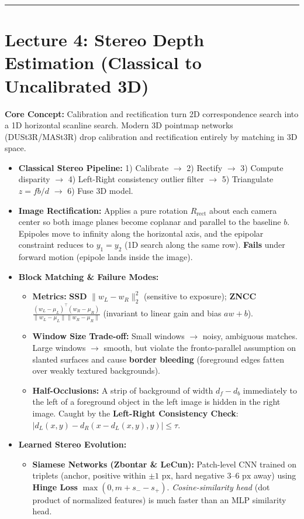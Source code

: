 \documentclass[10pt, a4paper]{article}
\newcommand{\hr}{\vspace{0.8em}\hrule\vspace{0.8em}}
\begin{document}
\hr
\section*{\textcolor{primary}{Lecture 4: Stereo Depth Estimation (Classical to Uncalibrated 3D)}}
\textbf{Core Concept:} Calibration and rectification turn 2D correspondence search into a 1D horizontal scanline search. Modern 3D pointmap networks (DUSt3R/MASt3R) drop calibration and rectification entirely by matching in 3D space.

\begin{itemize}
    \item \textbf{Classical Stereo Pipeline:} 1) Calibrate $\rightarrow$ 2) Rectify $\rightarrow$ 3) Compute disparity $\rightarrow$ 4) Left-Right consistency outlier filter $\rightarrow$ 5) Triangulate $z = fb/d$ $\rightarrow$ 6) Fuse 3D model.
    \item \textbf{Image Rectification:} Applies a pure rotation $R_{\text{rect}}$ about each camera center so both image planes become coplanar and parallel to the baseline $b$. Epipoles move to infinity along the horizontal axis, and the epipolar constraint reduces to $y_1 = y_2$ (1D search along the same row). \textbf{Fails} under forward motion (epipole lands inside the image).
    \item \textbf{Block Matching \& Failure Modes:}
    \begin{itemize}
        \item \textbf{Metrics:} \textbf{SSD} $\|w_L - w_R\|_2^2$ (sensitive to exposure); \textbf{ZNCC} $\frac{(w_L-\mu_L)^\top(w_R-\mu_R)}{\|w_L-\mu_L\|\|w_R-\mu_R\|}$ (invariant to linear gain and bias $a w + b$).
        \item \textbf{Window Size Trade-off:} Small windows $\rightarrow$ noisy, ambiguous matches. Large windows $\rightarrow$ smooth, but violate the fronto-parallel assumption on slanted surfaces and cause \textbf{border bleeding} (foreground edges fatten over weakly textured backgrounds).
        \item \textbf{Half-Occlusions:} A strip of background of width $d_f - d_b$ immediately to the left of a foreground object in the left image is hidden in the right image. Caught by the \textbf{Left-Right Consistency Check}: $|d_L(x,y) - d_R(x - d_L(x,y), y)| \le \tau$.
    \end{itemize}
    \item \textbf{Learned Stereo Evolution:}
    \begin{itemize}
        \item \textbf{Siamese Networks (Zbontar \& LeCun):} Patch-level CNN trained on triplets (anchor, positive within $\pm 1\text{ px}$, hard negative $3\text{--}6\text{ px}$ away) using \textbf{Hinge Loss} $\max(0, m + s_- - s_+)$. \emph{Cosine-similarity head} (dot product of normalized features) is much faster than an MLP similarity head.

\end{itemize}
\end{itemize}
\end{document}
